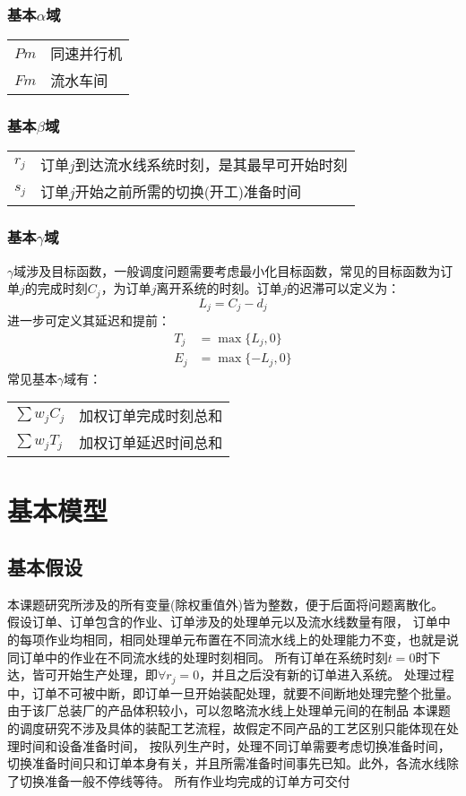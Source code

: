 \subsubsection{基本$\alpha$域}
\begin{supertabular}{ll}
$Pm$ & 同速并行机\\
$Fm$ & 流水车间\\
\end{supertabular}

\subsubsection{基本$\beta$域}
\begin{supertabular}{ll}
$r_j$ & 订单$j$到达流水线系统时刻，是其最早可开始时刻\\
$s_j$ & 订单$j$开始之前所需的切换(开工)准备时间\\
\end{supertabular}

\subsubsection{基本$\gamma$域}
$\gamma$域涉及目标函数，一般调度问题需要考虑最小化目标函数，常见的目标函数为订单$j$的完成时刻$C_j$，为订单$j$离开系统的时刻。订单$j$的迟滞可以定义为：
\[
L_j = C_j - d_j
\]
进一步可定义其延迟和提前：
\begin{align*}
T_j & = \max\{L_j,0\}\\
E_j & = \max\{-L_j,0\}
\end{align*}
常见基本$\gamma$域有：\\[3pt]
\begin{supertabular}{ll}
$\sum w_jC_j$ & 加权订单完成时刻总和 \\
$\sum w_jT_j$ & 加权订单延迟时间总和 \\
\end{supertabular}

\section{基本模型}
\subsection{基本假设}
本课题研究所涉及的所有变量(除权重值外)皆为整数，便于后面将问题离散化。
假设订单、订单包含的作业、订单涉及的处理单元以及流水线数量有限，
订单中的每项作业均相同，相同处理单元布置在不同流水线上的处理能力不变，也就是说同订单中的作业在不同流水线的处理时刻相同。
所有订单在系统时刻$t = 0$时下达，皆可开始生产处理，即$\forall r_j =0$，并且之后没有新的订单进入系统。
处理过程中，订单不可被中断，即订单一旦开始装配处理，就要不间断地处理完整个批量。
由于该厂总装厂的产品体积较小，可以忽略流水线上处理单元间的在制品
本课题的调度研究不涉及具体的装配工艺流程，故假定不同产品的工艺区别只能体现在处理时间和设备准备时间，
按队列生产时，处理不同订单需要考虑切换准备时间，切换准备时间只和订单本身有关，并且所需准备时间事先已知。此外，各流水线除了切换准备一般不停线等待。
所有作业均完成的订单方可交付


